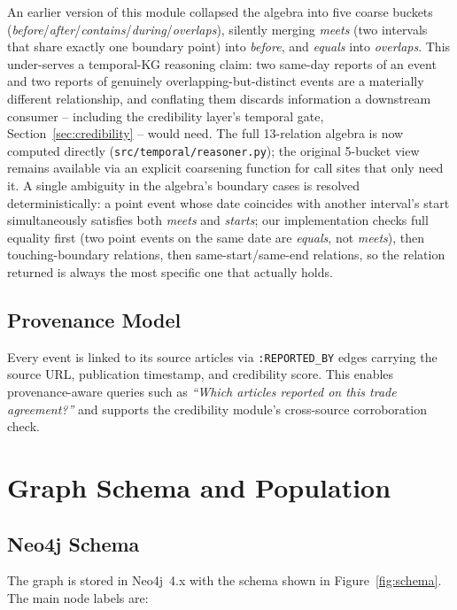 \documentclass[conference]{IEEEtran}
\begin{document}
An earlier version of this module collapsed the algebra into five coarse
buckets (\emph{before}/\emph{after}/\emph{contains}/\emph{during}/\emph{overlaps}),
silently merging \emph{meets} (two intervals that share exactly one
boundary point) into \emph{before}, and \emph{equals} into \emph{overlaps}.
This under-serves a temporal-KG reasoning claim: two same-day reports of an
event and two reports of genuinely overlapping-but-distinct events are a
materially different relationship, and conflating them discards information
a downstream consumer -- including the credibility layer's temporal gate,
Section~\ref{sec:credibility} -- would need. The full 13-relation algebra is
now computed directly (\texttt{src/temporal/reasoner.py}); the original
5-bucket view remains available via an explicit coarsening function for
call sites that only need it. A single ambiguity in the algebra's boundary
cases is resolved deterministically: a point event whose date coincides
with another interval's start simultaneously satisfies both \emph{meets}
and \emph{starts}; our implementation checks full equality first (two
point events on the same date are \emph{equals}, not \emph{meets}), then
touching-boundary relations, then same-start/same-end relations, so the
relation returned is always the most specific one that actually holds.

\subsection{Provenance Model}

Every event is linked to its source articles via \texttt{:REPORTED\_BY}
edges carrying the source URL, publication timestamp, and credibility score.
This enables provenance-aware queries such as \emph{``Which articles
reported on this trade agreement?''} and supports the credibility module's
cross-source corroboration check.

\section{Graph Schema and Population}
\label{sec:graph}

\subsection{Neo4j Schema}

The graph is stored in Neo4j~4.x with the schema shown in
Figure~\ref{fig:schema}. The main node labels are:
\end{document}
